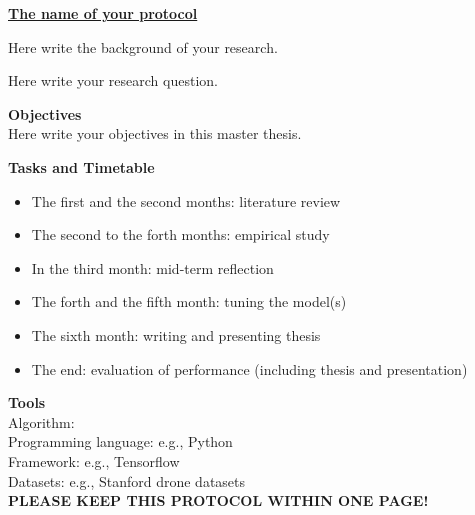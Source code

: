 \thispagestyle{empty}
\underline{\large{\textbf{The name of your protocol}}}

\vspace{1cm}
Here write the background of your research. 

Here write your research question.

\textbf{Objectives}\\
Here write your objectives in this master thesis.

\textbf{Tasks and Timetable}
\begin{itemize}
\small
    \item{The first and the second months: literature review}
    \item{The second to the forth months: empirical study}
    \item{In the third month: mid-term reflection}
    \item{The forth and the fifth month: tuning the model(s)}
    \item{The sixth month: writing and presenting thesis}
    \item{The end: evaluation of performance (including thesis and presentation)} 
\end{itemize}

\textbf{Tools}\\
Algorithm:  \\
Programming language: e.g., Python \\
Framework: e.g., Tensorflow\\
Datasets: e.g., Stanford drone datasets \\


\textbf{PLEASE KEEP THIS PROTOCOL WITHIN ONE PAGE!}

